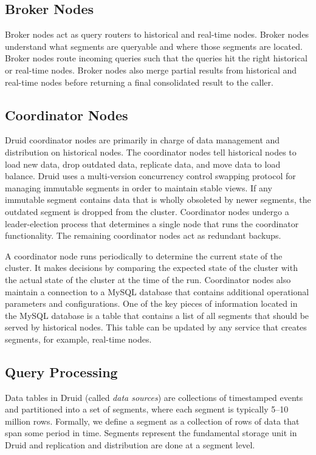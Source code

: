 \documentclass{vldb}
\begin{document}
\subsection{Broker Nodes}
Broker nodes act as query routers to historical and real-time nodes. Broker
nodes understand what segments are queryable and where those segments are
located. Broker nodes route incoming queries such that the queries hit the
right historical or real-time nodes. Broker nodes also merge partial results
from historical and real-time nodes before returning a final consolidated
result to the caller.

\subsection{Coordinator Nodes}
Druid coordinator nodes are primarily in charge of data management and
distribution on historical nodes. The coordinator nodes tell historical nodes
to load new data, drop outdated data, replicate data, and move data to load
balance. Druid uses a multi-version concurrency control swapping protocol for
managing immutable segments in order to maintain stable views.  If any
immutable segment contains data that is wholly obsoleted by newer segments, the
outdated segment is dropped from the cluster. Coordinator nodes undergo a
leader-election process that determines a single node that runs the coordinator
functionality. The remaining coordinator nodes act as redundant backups.

A coordinator node runs periodically to determine the current state of the
cluster. It makes decisions by comparing the expected state of the cluster with
the actual state of the cluster at the time of the run.  Coordinator nodes also
maintain a connection to a MySQL database that contains additional operational
parameters and configurations.  One of the key pieces of information located in
the MySQL database is a table that contains a list of all segments that should
be served by historical nodes.  This table can be updated by any service that
creates segments, for example, real-time nodes. 

\subsection{Query Processing}
Data tables in Druid (called \emph{data sources}) are collections of
timestamped events and partitioned into a set of segments, where each segment
is typically 5--10 million rows. Formally, we define a segment as a collection
of rows of data that span some period in time. Segments represent the
fundamental storage unit in Druid and replication and distribution are done at
a segment level.
\end{document}
